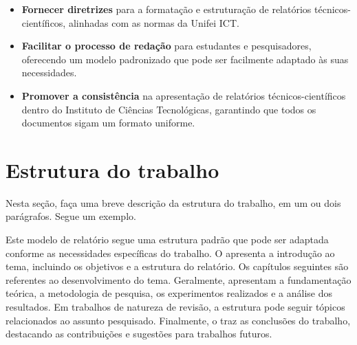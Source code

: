 \begin{itemize}
    \item \textbf{Fornecer diretrizes} para a formatação e estruturação de relatórios técnicos-científicos, alinhadas com as normas da Unifei ICT.
    \item \textbf{Facilitar o processo de redação} para estudantes e pesquisadores, oferecendo um modelo padronizado que pode ser facilmente adaptado às suas necessidades.
    \item \textbf{Promover a consistência} na apresentação de relatórios técnicos-científicos dentro do Instituto de Ciências Tecnológicas, garantindo que todos os documentos sigam um formato uniforme.
\end{itemize}

\section{Estrutura do trabalho}\label{sec:estrutura}

Nesta seção, faça uma breve descrição da estrutura do trabalho, em um ou dois parágrafos. Segue um exemplo.

Este modelo de relatório segue uma estrutura padrão que pode ser adaptada conforme as necessidades específicas do trabalho. O  apresenta a introdução ao tema, incluindo os objetivos e a estrutura do relatório. Os capítulos seguintes são referentes ao desenvolvimento do tema. Geralmente, apresentam a fundamentação teórica, a metodologia de pesquisa, os experimentos realizados e a análise dos resultados. Em trabalhos de natureza de revisão, a estrutura pode seguir tópicos relacionados ao assunto pesquisado. Finalmente, o  traz as conclusões do trabalho, destacando as contribuições e sugestões para trabalhos futuros.
